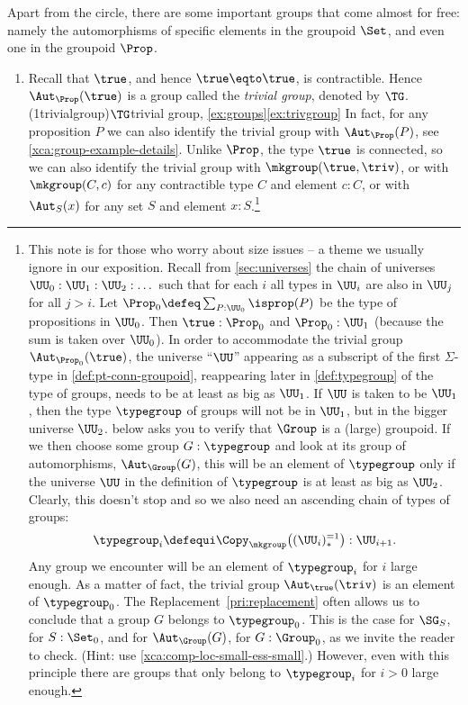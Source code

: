 \begin{example}\label{ex:groups}
  Apart from the circle, there are some important groups that come 
  almost for free: namely the automorphisms of specific elements
  in the groupoid $\Set$, and even one in the groupoid $\Prop$.
  \begin{enumerate}
  \item\label{ex:trivgroup}
  Recall that $\true$, and hence $\true \eqto \true$, is contractible.
  Hence $\Aut_\Prop(\true)$ is a group called the 
  \emph{trivial group}, denoted by $\TG$. 
  \glossary(1trivialgroup){$\protect\TG$}{trivial group,
      \cref{ex:groups}\ref{ex:trivgroup}}
  In fact, for any proposition $P$ we can also identify the trivial group 
  with $\Aut_\Prop(P)$, see \cref{xca:group-example-details}. 
  Unlike $\Prop$, the type $\true$ is connected,
  so we can also identify the trivial group with
  $\mkgroup (\true,\triv)$, or with $\mkgroup (C,c)$ for
  any contractible type $C$ and element $c:C$, or
  with $\Aut_{S}(x)$ for any set $S$ and element $x:S$.\footnote{%
This note is for those who worry about size issues -- a
theme we usually ignore in our exposition. 
Recall from \cref{sec:universes} the chain of
universes $\UU_0 : \UU_1 : \UU_2 : \dots$ such that for each $i$
all types in $\UU_i$ are also in $\UU_j$ for all $j>i$.
Let $\Prop_0 \defeq \sum_{P:\UU_0}\isprop(P)$ be the type of 
propositions in $\UU_0$. Then $\true:\Prop_0$ 
and $\Prop_0 : \UU_1$ (because the sum is taken over $\UU_0$).
In order to accommodate the trivial group $\Aut_{\Prop_0}(\true)$, 
the universe ``$\UU$'' appearing as a subscript of the first 
$\Sigma$-type in \cref{def:pt-conn-groupoid}, reappearing later in 
\cref{def:typegroup} of the type of groups,
needs to be at least as big as $\UU_1$. 
If $\UU$ is taken to be $\UU_1$, then the type $\typegroup$ of groups 
will not be in $\UU_1$, but in the bigger universe $\UU_2$.
 below asks you to verify that $\Group$
is a (large) groupoid. If we then choose some group $G:\typegroup$
and look at its group of automorphisms, $\Aut_\Group(G)$,
this will be an element of $\typegroup$ only if the universe $\UU$ in the
definition of $\typegroup$ is at least as big as $\UU_2$. Clearly, 
this doesn't stop and so we also need an ascending chain of types of groups:
  \[
    \typegroup_i \defequi \Copy_{\mkgroup}\bigl( (\UU_i)_*^{=1} \bigr) : \UU_{i+1}.
  \]
Any group we encounter will be an element of $\typegroup_i$ for $i$
large enough. As a matter of fact, the trivial group $\Aut_{\true}(\triv)$
is an element of $\typegroup_0$. The Replacement~\cref{pri:replacement}
often allows us to conclude that a group $G$ belongs to $\typegroup_0$.
This is the case for $\SG_S$, for $S:\Set_0$, and for $\Aut_\Group(G)$,
for $G:\Group_0$, as we invite the reader to check.
(Hint: use \cref{xca:comp-loc-small-ess-small}.)
However, even with this principle there are groups that only belong
to $\typegroup_i$ for $i>0$ large enough.

}
\end{enumerate}
\end{example}
